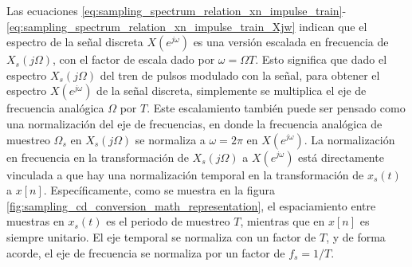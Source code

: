 \documentclass[a4paper]{report}
\begin{document}
Las ecuaciones \ref{eq:sampling_spectrum_relation_xn_impulse_train}-\ref{eq:sampling_spectrum_relation_xn_impulse_train_Xjw} indican que el espectro de la señal discreta \(X(e^{j\omega})\) es una versión escalada en frecuencia de \(X_s(j\Omega)\), con el factor de escala dado por \(\omega=\Omega T\). Esto significa que dado el espectro \(X_s(j\Omega)\) del tren de pulsos modulado con la señal, para obtener el espectro \(X(e^{j\omega})\) de la señal discreta, simplemente se multiplica el eje de frecuencia analógica \(\Omega\) por \(T\). Este escalamiento también puede ser pensado como una normalización del eje de frecuencias, en donde la frecuencia analógica de muestreo \(\Omega_s\) en \(X_s(j\Omega)\) se normaliza a \(\omega=2\pi\) en \(X(e^{j\omega})\). La normalización en frecuencia en la transformación de \(X_s(j\Omega)\) a \(X(e^{j\omega})\) está directamente vinculada a que hay una normalización temporal en la transformación de \(x_s(t)\) a \(x[n]\). Específicamente, como se muestra en la figura \ref{fig:sampling_cd_conversion_math_representation}, el espaciamiento entre muestras en \(x_s(t)\) es el periodo de muestreo \(T\), mientras que en \(x[n]\) es siempre unitario. El eje temporal se normaliza con un factor de \(T\), y de forma acorde, el eje de frecuencia se normaliza por un factor de \(f_s=1/T\).
\end{document}
